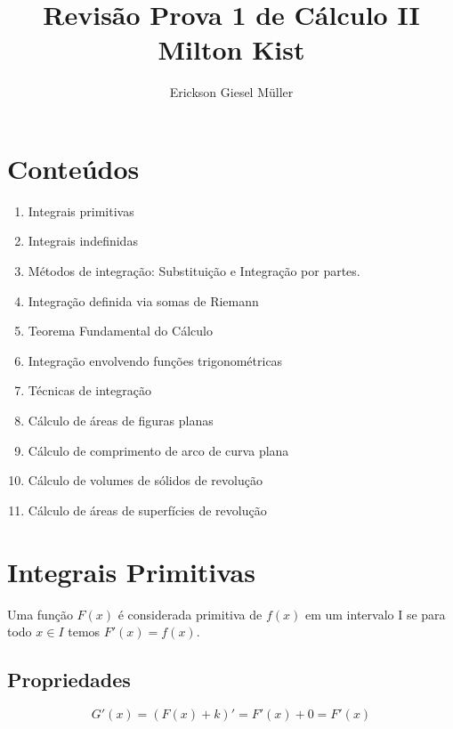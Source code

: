 \documentclass{article}
\title{Revisão Prova 1 de Cálculo II\\Milton Kist}
\author{Erickson Giesel Müller}
\begin{document}
	\maketitle
	
	\section{Conteúdos}
		\begin{enumerate}
			\item Integrais primitivas
			\item Integrais indefinidas
			\item Métodos de integração: Substituição e Integração por partes.
			\item Integração definida via somas de Riemann
			\item Teorema Fundamental do Cálculo
			\item Integração envolvendo funções trigonométricas
			\item Técnicas de integração
			\item Cálculo de áreas de figuras planas
			\item Cálculo de comprimento de arco de curva plana
			\item Cálculo de volumes de sólidos de revolução
			\item Cálculo de áreas de superfícies de revolução
		\end{enumerate}
	\newpage
	\section{Integrais Primitivas}
		Uma função $F(x)$ é considerada primitiva de $f(x)$ em um intervalo I se para todo $x \in I$ temos $F'(x)=f(x)$.
		\subsection{Propriedades}
			$$G'(x)=(F(x)+k)' = F'(x)+0=F'(x)$$
			
		
\end{document}
